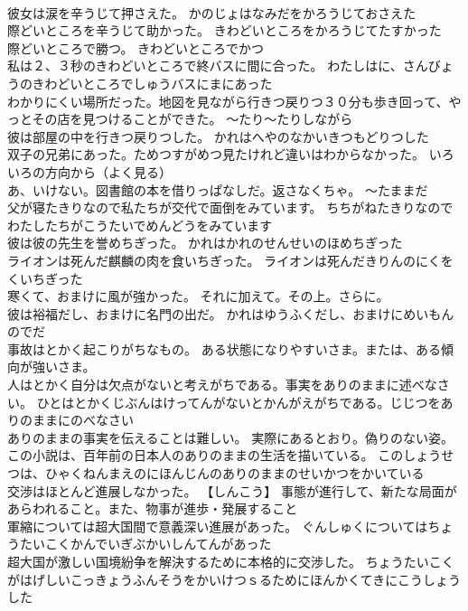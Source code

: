 \documentclass[8pt]{extreport}
\begin{document}
\begin{CJK}{UTF8}{min}
\\	彼女は涙を辛うじて押さえた。	かのじょはなみだをかろうじておさえた 
\\	際どいところを辛うじて助かった。	きわどいところをかろうじてたすかった 
\\	際どいところで勝つ。	きわどいところでかつ 
\\	私は２、３秒のきわどいところで終バスに間に合った。	わたしはに、さんびょうのきわどいところでしゅうバスにまにあった 
\\	わかりにくい場所だった。地図を見ながら行きつ戻りつ３０分も歩き回って、やっとその店を見つけることができた。	～たり～たりしながら
\\	彼は部屋の中を行きつ戻りつした。	かれはへやのなかいきつもどりつした 
\\	双子の兄弟にあった。ためつすがめつ見たけれど違いはわからなかった。	いろいろの方向から（よく見る）
\\	あ、いけない。図書館の本を借りっぱなしだ。返さなくちゃ。	～たままだ
\\	父が寝たきりなので私たちが交代で面倒をみています。	ちちがねたきりなのでわたしたちがこうたいでめんどうをみています 
\\	彼は彼の先生を誉めちぎった。	かれはかれのせんせいのほめちぎった 
\\	ライオンは死んだ麒麟の肉を食いちぎった。	ライオンは死んだきりんのにくをくいちぎった 
\\	寒くて、おまけに風が強かった。	それに加えて。その上。さらに。
\\	彼は裕福だし、おまけに名門の出だ。	かれはゆうふくだし、おまけにめいもんのでだ 
\\	事故はとかく起こりがちなもの。	ある状態になりやすいさま。または、ある傾向が強いさま。
\\	人はとかく自分は欠点がないと考えがちである。事実をありのままに述べなさい。	ひとはとかくじぶんはけってんがないとかんがえがちである。じじつをありのままにのべなさい 
\\	ありのままの事実を伝えることは難しい。	実際にあるとおり。偽りのない姿。
\\	この小説は、百年前の日本人のありのままの生活を描いている。	このしょうせつは、ひゃくねんまえのにほんじんのありのままのせいかつをかいている 
\\	交渉はほとんど進展しなかった。	【しんこう】 事態が進行して、新たな局面があらわれること。また、物事が進歩・発展すること
\\	軍縮については超大国間で意義深い進展があった。	ぐんしゅくについてはちょうたいこくかんでいぎぶかいしんてんがあった 
\\	超大国が激しい国境紛争を解決するために本格的に交渉した。	ちょうたいこくがはげしいこっきょうふんそうをかいけつｓるためにほんかくてきにこうしょうした 

\end{CJK}
\end{document}
